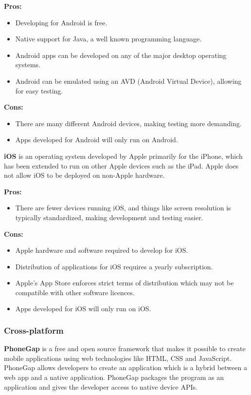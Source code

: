 \indent
  {\bf Pros:}
  \begin{itemize}
    \item Developing for Android is free.
    \item Native support for Java, a well known programming language.
    \item Android apps can be developed on any of the major desktop operating
          systems.
    \item Android can be emulated using an AVD (Android Virtual Device),
          allowing for easy testing.
  \end{itemize}

\indent
  {\bf Cons:}
  \begin{itemize}
    \item There are many different Android devices, making testing more
          demanding.
    \item Apps developed for Android will only run on Android.
  \end{itemize}

\noindent
{\bf iOS} is an operating system developed by Apple primarily for the iPhone,
which has been extended to run on other Apple devices such as the iPad. Apple
does not allow iOS to be deployed on non-Apple hardware.

\indent
  {\bf Pros:}
  \begin{itemize}
    \item There are fewer devices running iOS, and things like screen
          resolution is typically standardized, making development and testing
          easier.
  \end{itemize}

\indent
  {\bf Cons:}
  \begin{itemize}
    \item Apple hardware and software required to develop for iOS.
    \item Distribution of applications for iOS requires a yearly subscription.
    \item Apple's App Store enforces strict terms of distribution which may not
          be compatible with other software licences.
    \item Apps developed for iOS will only run on iOS.
  \end{itemize}


\subsubsection{Cross-platform}
{\bf PhoneGap} is a free and open source framework that makes it possible
to create mobile applications using web technologies like HTML, CSS and
JavaScript. PhoneGap allows developers to create an application which is a
hybrid between a web app and a native application. PhoneGap packages the
program as an application and gives the developer access to native device APIs.


